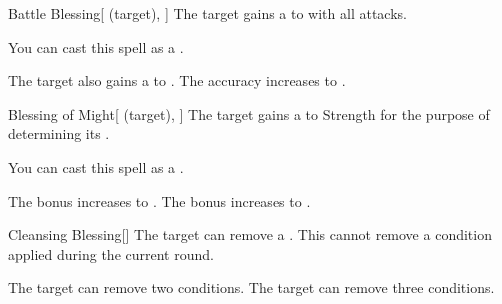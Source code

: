 \lowercase{\hypertarget{spell:Battle Blessing}{}}\label{spell:Battle Blessing}
\begin{attuneability}[Rank 3]{\hypertarget{spell:Battle Blessing}{Battle Blessing}}[ (target), ]
The target gains a   to  with all attacks.

You can cast this spell as a .

\rankline
{} The target also gains a   to .
 The accuracy increases to .
\end{attuneability}
\vspace{0.25em}



\lowercase{\hypertarget{spell:Blessing of Might}{}}\label{spell:Blessing of Might}
\begin{attuneability}[Rank 3]{\hypertarget{spell:Blessing of Might}{Blessing of Might}}[ (target), ]
The target gains a   to Strength for the purpose of determining its .

You can cast this spell as a .

\rankline
{} The bonus increases to .
 The bonus increases to .
\end{attuneability}
\vspace{0.25em}



\lowercase{\hypertarget{spell:Cleansing Blessing}{}}\label{spell:Cleansing Blessing}
\begin{freeability}[Rank 3]{\hypertarget{spell:Cleansing Blessing}{Cleansing Blessing}}[]
The target can remove a .
This cannot remove a condition applied during the current round.

\rankline
{} The target can remove two conditions.
 The target can remove three conditions.
\end{freeability}
\vspace{0.25em}




